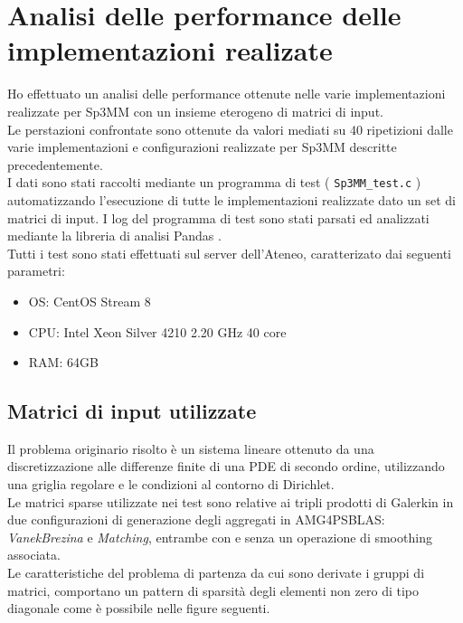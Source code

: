 \chapter{Analisi delle performance delle implementazioni realizate}
\label{ChPerf}

Ho effettuato un analisi delle performance ottenute nelle varie implementazioni 
realizzate per Sp3MM con un insieme eterogeno di matrici di input.\\
Le perstazioni confrontate sono ottenute da valori mediati su 40 ripetizioni
dalle varie implementazioni e configurazioni realizzate per Sp3MM descritte precedentemente.\\
I dati sono stati raccolti mediante un programma di test ( \verb|Sp3MM_test.c| ) automatizzando
l'esecuzione di tutte le implementazioni realizzate dato un set di matrici di input.
I log del programma di test sono stati parsati ed analizzati mediante la libreria di analisi Pandas \cite{pandasMan}.\\
Tutti i test sono stati effettuati sul server dell'Ateneo, caratterizato dai seguenti parametri:
\begin{itemize}
	\item	 OS:	CentOS Stream 8
	\item	CPU:	Intel Xeon Silver 4210 2.20 GHz 40 core
	\item	RAM:	64GB
\end{itemize}

\section{Matrici di input utilizzate} \label{chPerf:inputs}
Il problema originario risolto è un sistema lineare ottenuto da 
una discretizzazione alle differenze finite 
di una PDE di secondo ordine,
utilizzando una griglia regolare e le condizioni al contorno di Dirichlet.\\ %
Le matrici sparse utilizzate nei test
sono relative ai tripli prodotti di Galerkin in due configurazioni
di generazione degli aggregati in AMG4PSBLAS:
\emph{VanekBrezina} e \emph{Matching}, entrambe con e senza un operazione di smoothing associata.\\
Le caratteristiche del problema di partenza da cui sono derivate i gruppi di matrici,
comportano un pattern di sparsità degli elementi non zero di tipo diagonale 
come è possibile nelle figure seguenti.\\

